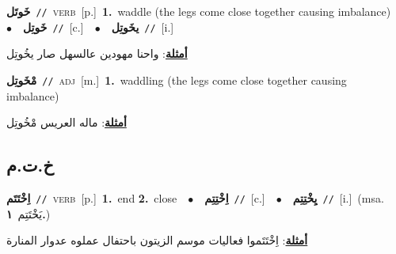\documentclass[10pt,a4paper,twoside]{article} %
\begin{document}
\begin{multicols}{2}
{\setlength\topsep{0pt}\textbf{\foreignlanguage{arabic}{خَوتَل}}\ {\color{gray}\texttt{//}\color{black}}\ \textsc{verb}\ [p.]\ \textbf{1.}~waddle (the legs come close together causing imbalance)\ \ $\bullet$\ \ \setlength\topsep{0pt}\textbf{\foreignlanguage{arabic}{خَوتِل}}\ {\color{gray}\texttt{//}\color{black}}\ [c.]\ \ $\bullet$\ \ \setlength\topsep{0pt}\textbf{\foreignlanguage{arabic}{يخَوتِل}}\ {\color{gray}\texttt{//}\color{black}}\ [i.]\  \begin{flushright}\color{gray}\foreignlanguage{arabic}{\textbf{\underline{\foreignlanguage{arabic}{أمثلة}}}: واحنا مهودين عالسهل صار يخُوتِل}\end{flushright}\color{black}} \vspace{2mm}

{\setlength\topsep{0pt}\textbf{\foreignlanguage{arabic}{مْخَوتِل}}\ {\color{gray}\texttt{//}\color{black}}\ \textsc{adj}\ [m.]\ \textbf{1.}~waddling (the legs come close together causing imbalance)\  \begin{flushright}\color{gray}\foreignlanguage{arabic}{\textbf{\underline{\foreignlanguage{arabic}{أمثلة}}}: ماله العريس مْخُوتِل}\end{flushright}\color{black}} \vspace{2mm}

\vspace{-3mm}
\subsection*{\color{blue}\foreignlanguage{arabic}{خ.ت.م}\color{blue}{}} 

{\setlength\topsep{0pt}\textbf{\foreignlanguage{arabic}{اِخْتَتَم}}\ {\color{gray}\texttt{//}\color{black}}\ \textsc{verb}\ [p.]\ \textbf{1.}~end  \textbf{2.}~close\ \ $\bullet$\ \ \setlength\topsep{0pt}\textbf{\foreignlanguage{arabic}{اِخْتِتِم}}\ {\color{gray}\texttt{//}\color{black}}\ [c.]\ \ $\bullet$\ \ \setlength\topsep{0pt}\textbf{\foreignlanguage{arabic}{يِخْتِتِم}}\ {\color{gray}\texttt{//}\color{black}}\ [i.]\ \color{gray}(msa. \foreignlanguage{arabic}{يَخْتَتِم}~\foreignlanguage{arabic}{\textbf{١.}})\color{black}\  \begin{flushright}\color{gray}\foreignlanguage{arabic}{\textbf{\underline{\foreignlanguage{arabic}{أمثلة}}}: اِخْتَتَموا فعاليات موسم الزيتون باحتفال عملوه عدوار المنارة}\end{flushright}\color{black}} \vspace{2mm}


\end{multicols}
\end{document}
